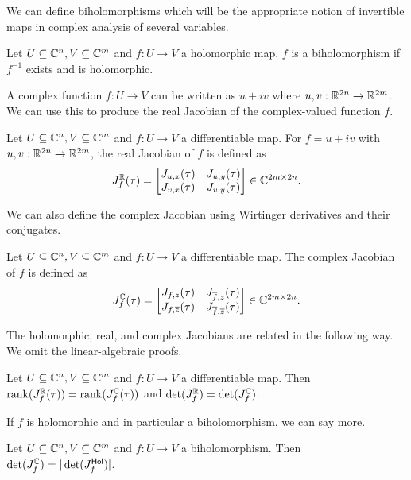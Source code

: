 We can define biholomorphisms which will be the appropriate notion of invertible maps in complex analysis of several variables. 
\begin{definition}[Biholomorphism]\label{def: biholomorphism}
    Let $U\subseteq\mathbb{C}^{n},V\subseteq\mathbb{C}^{m}$ and $f:U\to V$ a holomorphic map. $f$ is a biholomorphism if $f^{-1}$ exists and is holomorphic.
\end{definition}
A complex function $f:U\to V$ can be written as $u+iv$ where $u,v:\mathbb{R}^{2n}\to\mathbb{R}^{2m}$. We can use this to produce the real Jacobian of the complex-valued function $f$. 
\begin{definition}\label{def: real Jacobian}
    Let $U\subseteq\mathbb{C}^{n},V\subseteq\mathbb{C}^{m}$ and $f:U\to V$ a differentiable map. For $f=u+iv$ with $u,v:\mathbb{R}^{2n}\to\mathbb{R}^{2m}$, the real Jacobian of $f$ is defined as 
    $$J^{\mathbb{R}}_{f}(\tau)=\begin{bmatrix}
        J_{u,x}(\tau) & J_{u,y}(\tau) \\ J_{v,x}(\tau) & J_{v,y}(\tau)
    \end{bmatrix}\in\mathbb{C}^{2m\times 2n}.$$
\end{definition}
We can also define the complex Jacobian using Wirtinger derivatives and their conjugates. 
\begin{definition}\label{def: complex Jacobian}
    Let $U\subseteq\mathbb{C}^{n},V\subseteq\mathbb{C}^{m}$ and $f:U\to V$ a differentiable map. The complex Jacobian of $f$ is defined as 
    $$J^{\mathbb{C}}_{f}(\tau)=\begin{bmatrix}
        J_{f,z}(\tau) & J_{\overline{f},z}(\tau) \\ J_{f,\overline{z}}(\tau) & J_{\overline{f},\overline{z}}(\tau)
    \end{bmatrix}\in\mathbb{C}^{2m\times 2n}.$$
\end{definition}
The holomorphic, real, and complex Jacobians are related in the following way. We omit the linear-algebraic proofs. 
\begin{proposition}\label{prop: ranks and determinants of real and complex Jacobians}
    Let $U\subseteq\mathbb{C}^{n},V\subseteq\mathbb{C}^{m}$ and $f:U\to V$ a differentiable map. Then $\mathrm{rank}(J_{f}^{\mathbb{R}}(\tau))=\mathrm{rank}(J_{f}^{\mathbb{C}}(\tau))$ and $\det(J_{f}^{\mathbb{R}})=\det(J_{f}^{\mathbb{C}})$.\marginpar{}
\end{proposition}
If $f$ is holomorphic and in particular a biholomorphism, we can say more. 
\begin{proposition}\label{prop: biholomorphism and orientation preservation}
    Let $U\subseteq\mathbb{C}^{n},V\subseteq\mathbb{C}^{m}$ and $f:U\to V$ a biholomorphism. Then $\det(J_{f}^{\mathbb{C}})=|\det(J_{f}^{\mathsf{Hol}})|$.
\end{proposition}
